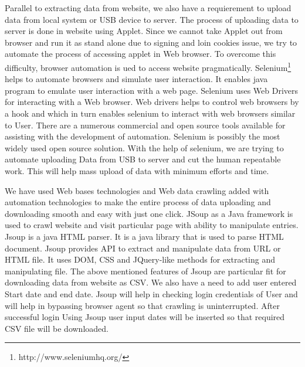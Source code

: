 \documentclass[article,type=msc,colorback,accentcolor=tud9c,twoside,11pt]{tudthesis}
\begin{document}
Parallel to extracting data from website, we also have a requierement to upload data from local system or USB device to server. The process of uploading data to server is done in website using Applet. Since we cannot take Applet\cite{Javaapplet} out from browser and run it as stand alone due to signing and loin cookies issue, we try to automate the process of accessing applet in Web browser. To overcome this difficulty, browser automation is ued to access website pragmatically. Selenium\footnote{http://www.seleniumhq.org/} helps to automate browsers and simulate user interaction. It enables java program to emulate user interaction with a web page. Selenium\cite{Webdriver} uses Web Drivers for interacting with a Web browser. Web drivers helps to control web browsers by a hook and which in turn enables selenium to interact with web browsers similar to User. There are a numerous commercial and open source tools available for assisting with the development of automation. Selenium is possibly the most widely used open source solution. With the help of selenium, we are trying to automate uploading Data from USB to server and cut the human repeatable work. This will help mass upload of data with minimum efforts and time.

We have used Web bases technologies and Web data crawling added with automation technologies to make the entire process of data uploading and downloading smooth and easy with just one click. JSoup\cite{Jsoup} as a Java framework is used to crawl website and visit particular page with ability to manipulate entries. Jsoup is a java HTML parser. It is a java library that is used to parse HTML\cite{BeaqleJSHTML} document. Jsoup provides API to extract and manipulate data from URL or HTML file. It uses DOM, CSS and JQuery-like methods for extracting and manipulating file. The above mentioned features of Jsoup are particular fit for downloading data from website as CSV. We also have a need to add user entered Start date and end date. Jsoup will help in checking login credentials of User and will help in bypassing browser agent so that crawling is uninterrupted. After successful login Using Jsoup user input dates will be inserted so that required CSV file will be downloaded. 
\end{document}
